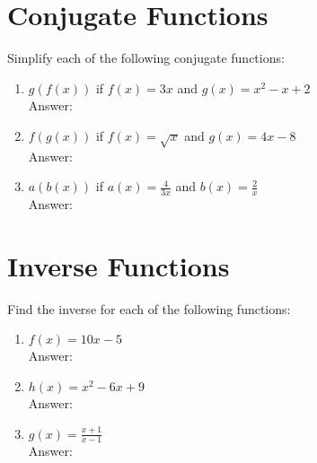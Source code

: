 \documentclass[12pt]{extarticle}
\begin{document}
\section{Conjugate Functions}
{Simplify each of the following conjugate functions:}
\begin{enumerate}
    \itemsep 2.0em
    \item {$g(f(x))$ if $f(x) = 3x$ and $g(x) = x^2 - x + 2$ \\Answer: }
    \item {$f(g(x))$ if $f(x) = \sqrt{x}$ and $g(x) = 4x - 8$ \\Answer: }
    \item {$a(b(x))$ if $a(x) = \frac{4}{3x}$ and $b(x) = \frac{2}{x}$ \\Answer: }
\end{enumerate}

\section{Inverse Functions}
{Find the inverse for each of the following functions:}
\begin{enumerate}
    \itemsep 2.0em
    \item {$f(x) = 10x - 5$ \\Answer: }
    \item {$h(x) = x^2 - 6x + 9$ \\Answer: }
    \item {$g(x) = \frac{x + 1}{x - 1}$ \\Answer: }
\end{enumerate}
\end{document}

